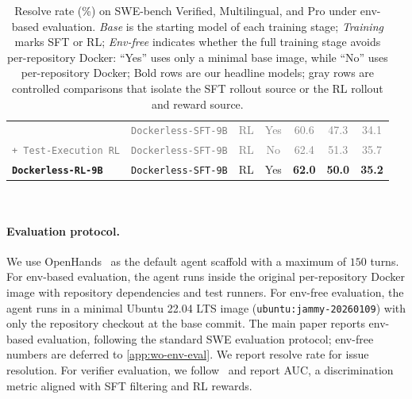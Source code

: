 \documentclass[]{arxiv_template}
\newcommand{\approach}{Dockerless\xspace}
\begin{document}
\begin{table}[t]
{\begin{tabular}{l l l c ccc}
                                & \textcolor{gray}{\texttt{\approach-SFT-9B}}            & \textcolor{gray}{RL}     & \textcolor{gray}{Yes} & \textcolor{gray}{60.6} & \textcolor{gray}{47.3} & \textcolor{gray}{34.1} \\
\textcolor{gray}{\texttt{+\,Test-Execution RL}}
                                & \textcolor{gray}{\texttt{\approach-SFT-9B}}            & \textcolor{gray}{RL}     & \textcolor{gray}{No}               & \textcolor{gray}{62.4} & \textcolor{gray}{51.3} & \textcolor{gray}{35.7} \\
\rowcolor{black!4}
\textbf{\texttt{\approach-RL-9B}}  & \texttt{\approach-SFT-9B}         & RL     & Yes     & \textbf{62.0} & \textbf{50.0} & \textbf{35.2} \\
\bottomrule
\end{tabular}%
}
\\[2pt]
\caption{
Resolve rate (\%) on SWE-bench Verified, Multilingual, and Pro under env-based evaluation.
\emph{Base} is the starting model of each training stage; 
\emph{Training} marks SFT or RL; 
\emph{Env-free} indicates whether the full training stage avoids per-repository Docker: ``Yes'' uses only a minimal base image, while ``No'' uses per-repository Docker;
Bold rows are our headline models; gray rows are controlled comparisons that isolate the SFT rollout source or the RL rollout and reward source.
}
\label{tab:main}
\end{table}


\paragraph{Evaluation protocol.}
We use OpenHands~\citep{wang2025openhands} as the default agent scaffold with a maximum of $150$ turns.
For env-based evaluation, the agent runs inside the original per-repository Docker image with repository dependencies and test runners.
For env-free evaluation, the agent runs in a minimal Ubuntu 22.04 LTS image (\texttt{ubuntu:jammy-20260109}) with only the repository checkout at the base commit.
The main paper reports env-based evaluation, following the standard SWE evaluation protocol; env-free numbers are deferred to \cref{app:wo-env-eval}.
We report resolve rate for issue resolution.
For verifier evaluation, we follow~\citep{shum2025swe} and report AUC, a discrimination metric aligned with SFT filtering and RL rewards.
\end{document}
